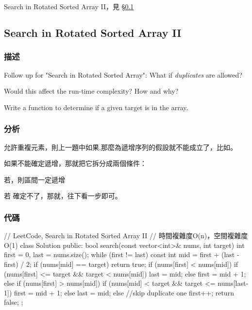 \begindot
\item Search in Rotated Sorted Array II，見 \S \ref{sec:search-in-rotated-sorted-array-ii}
\myenddot


\subsection{Search in Rotated Sorted Array II}
\label{sec:search-in-rotated-sorted-array-ii}


\subsubsection{描述}
Follow up for "Search in Rotated Sorted Array": What if \emph{duplicates} are allowed?

Would this affect the run-time complexity? How and why?

Write a function to determine if a given target is in the array.


\subsubsection{分析}
允許重複元素，則上一題中如果,那麼\fn{[l,m]}為遞增序列的假設就不能成立了，比如\code{\[1,3,1,1,1\]}。

如果不能確定遞增，那就把它拆分成兩個條件：
\begindot
\item 若，則區間\fn{[l,m]}一定遞增
\item 若 確定不了，那就，往下看一步即可。
\myenddot

\subsubsection{代碼}
\begin{Code}
// LeetCode, Search in Rotated Sorted Array II
// 時間複雜度O(n)，空間複雜度O(1)
class Solution {
public:
    bool search(const vector<int>& nums, int target) {
        int first = 0, last = nums.size();
        while (first != last) {
            const int mid = first  + (last - first) / 2;
            if (nums[mid] == target)
                return true;
            if (nums[first] < nums[mid]) {
                if (nums[first] <= target && target < nums[mid])
                    last = mid;
                else
                    first = mid + 1;
            } else if (nums[first] > nums[mid]) {
                if (nums[mid] < target && target <= nums[last-1])
                    first = mid + 1;
                else
                    last = mid;
            } else
                //skip duplicate one
                first++;
        }
        return false;
    }
};
\end{Code}


